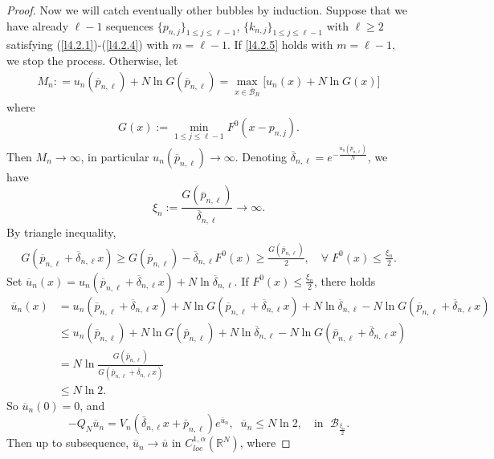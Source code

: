 \documentclass[11pt]{amsart}
\numberwithin{equation}{section}
\begin{document}
\begin{proof}
Now we will catch eventually other bubbles by induction. Suppose that we have already $\ell-1$ sequences $\{p_{n, j}\}_{1\le j \le \ell-1}$, $\{k_{n, j}\}_{1\le j \le \ell-1}$ with $\ell\geq 2$ satisfying (\ref{l4.2.1})-(\ref{l4.2.4}) with $m=\ell-1$. If \eqref{l4.2.5} holds with $m=\ell-1$, we stop the process. Otherwise, let
\begin{align*}
M_{n}: = u_{n}(\overline{p}_{n, \ell})+N\ln G(\overline{p}_{n, \ell}) = \max_{x\in\overline{ \mathcal{B}}_{R}}\big[u_{n}(x)+N\ln G(x)\big]
\end{align*}
where
\begin{align*}
G(x) := \min_{1 \leq j \leq \ell-1}F^{0}(x-p_{n, j}).
\end{align*}
Then $M_{n}\rightarrow\infty$, in particular $u_{n}(\overline{p}_{n, \ell})\rightarrow\infty$. Denoting $\overline{\delta}_{n, \ell}=e^{-\frac{u_{n}(\overline{p}_{n, \ell})}{N}}$,  we have
$$\xi_n := \frac{G(\overline{p}_{n, \ell})}{\overline{\delta}_{n, \ell}}\rightarrow\infty.$$
By triangle inequality,
 \begin{align*}
G(\overline{p}_{n, \ell}+\overline{\delta}_{n, \ell}x)\geq G(\overline{p}_{n, \ell}) -\overline{\delta}_{n, \ell}F^{0}(x) \geq \frac{G(\overline{p}_{n, \ell})}{2}, \quad \forall\; F^{0}(x)\leq\frac{\xi_n}{2}.
 \end{align*}
 Set $\overline{u}_{n}(x)=u_{n}(\overline{p}_{n, \ell}+\overline{\delta}_{n, \ell}x)+N\ln\overline{\delta}_{n, \ell}$. If $F^{0}(x)\leq \frac{\xi_n}{2}$, there holds
 \begin{align*}
 \overline{u}_{n}(x) &=u_{n}(\overline{p}_{n, \ell}+\overline{\delta}_{n, \ell}x)+N\ln G(\overline{p}_{n, \ell}+\overline{\delta}_{n, \ell}x) + N\ln\overline{\delta}_{n, \ell} - N\ln G(\overline{p}_{n, \ell}+\overline{\delta}_{n, \ell}x)\\
 &\leq u_{n}(\overline{p}_{n, \ell})+N\ln G(\overline{p}_{n, \ell})+ N\ln\overline{\delta}_{n, \ell} - N\ln G(\overline{p}_{n, \ell}+\overline{\delta}_{n, \ell}x)\\
 &= N\ln\frac{G(\overline{p}_{n, \ell})}{G(\overline{p}_{n, \ell}+\overline{\delta}_{n, \ell}x)}\\
 &\leq N\ln2.
 \end{align*}
So $\overline{u}_{n}(0) =0$, and
$$-Q_{N}\overline{u}_{n} = V_{n}(\bar{\delta}_{n, \ell}x+\bar{p}_{n, \ell})e^{\overline{u}_{n}},  \;\;
\overline{u}_{n} \leq N\ln2,  \quad   \mbox{in }\;  {\mathcal B}_\frac{\xi_n}{2}.$$
Then up to subsequence, $\overline{u}_{n}\rightarrow\overline{u}$ in $C_{loc}^{1, \alpha}(\mathbb{R}^{N})$, where

\end{proof}
\end{document}
